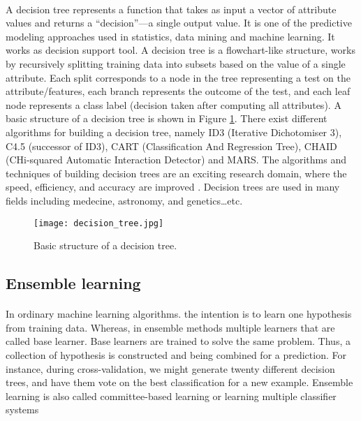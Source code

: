 \paragraph{}
A decision tree represents a function that takes as input a vector of attribute values and returns a “decision”—a single output value\cite{ML:2}. It is one of the predictive modeling approaches used in statistics, data mining and machine learning. It works as decision support tool. A decision tree is a flowchart-like structure, works by recursively splitting training data into subsets based on the value of a single attribute. Each split corresponds to a node in the tree representing a test on the attribute/features, each branch represents the outcome of the test, and each leaf node represents a class label (decision taken after computing all attributes). A basic structure of a decision tree is shown in Figure \ref{decision_tree}.\cite{MLDT:1,MLDT:2}
There exist different algorithms for building a decision tree, namely ID3 (Iterative Dichotomiser 3), C4.5 (successor of ID3), CART (Classification And Regression Tree), CHAID (CHi-squared Automatic Interaction Detector) and MARS. The algorithms and techniques of building decision trees are an exciting research domain, where the speed, efficiency, and accuracy are improved \cite{MLDT:2}.
Decision trees are used in many fields including medecine\cite{MLDTAP:3,MLDTAP:4}, astronomy\cite{MLDTAP:1}, and genetics\cite{MLDTAP:2}\dots etc.

\begin{figure}[ht]
 \texttt{[image: decision\_tree.jpg]}
 \centering         
 \caption{Basic structure of a decision tree.}
 \label{decision_tree}
\end{figure}

\subsection{Ensemble learning}
\paragraph{}
In ordinary machine learning algorithms. the intention is to learn one hypothesis from training data. Whereas, in ensemble methods\cite{MLEL:2} multiple learners that are called base learner. Base learners are trained to solve the same problem. Thus, a collection of hypothesis is constructed and being combined for a prediction. For instance, during cross-validation, we might generate twenty different decision trees, and have them vote on the best classification for a new example. Ensemble learning is also called committee-based learning or learning multiple classifier systems\cite{ML:2}
